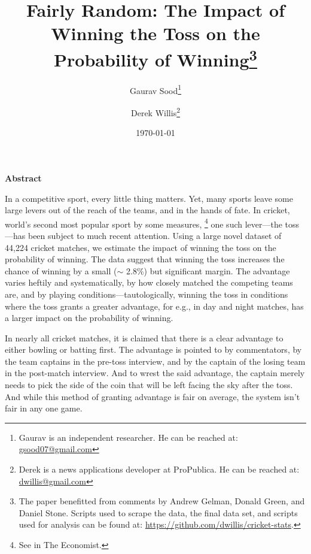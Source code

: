 \documentclass[12pt]{article}
\begin{document}
\title{\vspace{-.5cm}\normalsize{Fairly Random: The Impact of Winning the Toss on the Probability of Winning\footnote{The paper benefitted from comments by Andrew Gelman, Donald Green, and Daniel Stone. Scripts used to scrape the data, the final data set, and scripts used for analysis can be found at: \href{https://github.com/dwillis/cricket-stats}{https://github.com/dwillis/cricket-stats}. }\vspace{.5cm}}}
\author{\normalsize{Gaurav Sood}\footnote{Gaurav is an independent researcher. He can be reached at: \href{mailto:gsood07@gmail.com}{\small{gsood07@gmail.com}}} \and \normalsize{Derek Willis}\footnote{Derek is a  news applications developer at ProPublica. He can be reached at: \href{mailto:dwillis@gmail.com}{\small{dwillis@gmail.com}}}}
\date{\vspace{.5cm}\normalsize{\today}}
\maketitle
\doublespacing

\begin{center}\textbf{Abstract}\\\end{center}
In a competitive sport, every little thing matters. Yet, many sports leave some large levers out of the reach of the teams, and in the hands of fate. In cricket, world's second most popular sport by some measures, \footnote{See \citet{Economist2011} in The Economist.} one such lever---the toss---has been subject to much recent attention. Using a large novel dataset of 44,224 cricket matches, we estimate the impact of winning the toss on the probability of winning. The data suggest that winning the toss increases the chance of winning by a small ($\sim$ 2.8\%) but significant margin. The advantage varies heftily and systematically, by how closely matched the competing teams are, and by playing conditions---tautologically, winning the toss in conditions where the toss grants a greater advantage, for e.g., in day and night matches, has a larger impact on the probability of winning.  
\clearpage

In nearly all cricket matches, it is claimed that there is a clear advantage to either bowling or batting first. The advantage is pointed to by commentators, by the team captains in the pre-toss interview, and by the captain of the losing team in the post-match interview. And to wrest the said advantage, the captain merely needs to pick the side of the coin that will be left facing the sky after the toss. And while this method of granting advantage is fair on average, the system isn't fair in any one game. 
\end{document}
